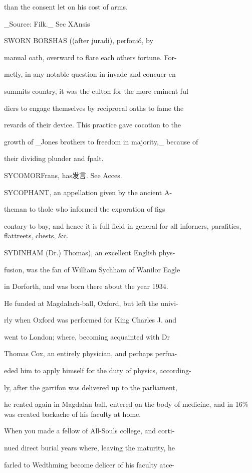 \documentclass{article}
\begin{document}
than the consent let on his cost of arms.

\_Source: Filk.\_ Sec XAnsis

SWORN BORSHAS ((after juradi), perfonió, by

manual oath, overward to flare each others fortune. For-

metly, in any notable question in invade and concuer en

summits country, it was the culton for the more eminent ful

diers to engage themselves by reciprocal oaths to fame the

revards of their device. This practice gave cocotion to the

growth of \_Jones brothers to freedom in majority,\_ because of

their dividing plunder and fpalt.

SYCOMORFrans, has发言. See Acces.

SYCOPHANT, an appellation given by the ancient A-

theman to thole who informed the exporation of figs

contary to bay, and hence it is full field in general for all inforners, parafities, flattreets, chests, \&c.

SYDINHAM (Dr.) Thomas), an excellent English phys-

fusion, was the fan of William Sychham of Wanilor Eagle

in Dorforth, and was born there about the year 1934.

He funded at Magdalach-ball, Oxford, but left the univi-

rly when Oxford was performed for King Charles J. and

went to London; where, becoming acquainted with Dr

Thomas Cox, an entirely physician, and perhaps perfua-

eded him to apply himself for the duty of physics, according-

ly, after the garrifon was delivered up to the parliament,

he rented again in Magdalan ball, entered on the body of medicine, and in 16\% was created backache of his faculty at home.

When you made a fellow of All-Souls college, and corti-

nued direct burial years where, leaving the maturity, he

farled to Wedthming become delicer of his faculty atce-
\end{document}
